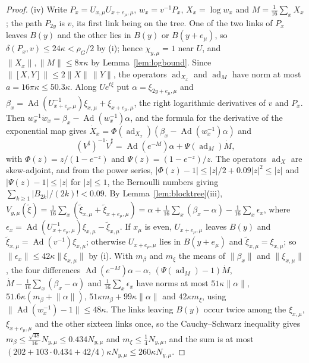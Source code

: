 \documentclass[11pt]{amsart}
\theoremstyle{definition}
\theoremstyle{remark}
\numberwithin{equation}{section}
\begin{document}
\begin{proof}
(iv) Write $P_x=U_{x,\mu}U_{x+e_\mu,\mu}$, $w_x=v^{-1}P_x$, $X_x=\log w_x$
and $M=\frac1{16}\sum_xX_x$; the path $P_{2y}$ is $v$, its first link being
on the tree. One of the two links of $P_x$ leaves $B(y)$ and the other lies
in $B(y)$ or $B(y+e_\mu)$, so $\delta(P_x,v)\le24\kappa<\rho_G/2$ by (i);
hence $\chi_{y,\mu}=1$ near $U$, and $\lVert X_x\rVert,\lVert M\rVert\le
8\pi\kappa$ by Lemma~\ref{lem:logbound}. Since $\lVert[X,Y]\rVert\le2
\lVert X\rVert\,\lVert Y\rVert$, the operators $\operatorname{ad}_{X_x}$
and $\operatorname{ad}_M$ have norm at most $a=16\pi\kappa\le50.3\kappa$.
Along $Ue^{t\xi}$ put $\alpha=\xi_{2y+e_\mu,\mu}$ and $\beta_x=
\operatorname{Ad}(U_{x+e_\mu,\mu}^{-1})\xi_{x,\mu}+\xi_{x+e_\mu,\mu}$, the
right logarithmic derivatives of $v$ and $P_x$. Then $w_x^{-1}\dot w_x=
\beta_x-\operatorname{Ad}(w_x^{-1})\alpha$, and the formula for the
derivative of the exponential map gives $\dot X_x=\Phi(\operatorname{ad}
_{X_x})(\beta_x-\operatorname{Ad}(w_x^{-1})\alpha)$ and
\[
(V^\sharp)^{-1}\dot V^\sharp=\operatorname{Ad}(e^{-M})\alpha+\Psi(
\operatorname{ad}_M)\dot M,
\]
with $\Phi(z)=z/(1-e^{-z})$ and $\Psi(z)=(1-e^{-z})/z$. The operators
$\operatorname{ad}_X$ are skew-adjoint, and from the power series,
$|\Phi(z)-1|\le|z|/2+0.09|z|^2\le|z|$ and $|\Psi(z)-1|\le|z|$ for $|z|\le
1$, the Bernoulli numbers giving $\sum_{k\ge1}|B_{2k}|/(2k)!<0.09$.
By Lemma~\ref{lem:blocktree}(iii), $V_{y,\mu}(\tilde\xi)=\frac1{16}\sum_x
(\tilde\xi_{x,\mu}+\tilde\xi_{x+e_\mu,\mu})=\alpha+\frac1{16}\sum_x(\beta_x
-\alpha)-\frac1{16}\sum_x\epsilon_x$, where $\epsilon_x=\operatorname{Ad}(
U_{x+e_\mu,\mu}^{-1})\xi_{x,\mu}-\tilde\xi_{x,\mu}$. If $x_\mu$ is even,
$U_{x+e_\mu,\mu}$ leaves $B(y)$ and $\tilde\xi_{x,\mu}=\operatorname{Ad}(v^{-
1})\xi_{x,\mu}$; otherwise $U_{x+e_\mu,\mu}$ lies in $B(y+e_\mu)$ and
$\tilde\xi_{x,\mu}=\xi_{x,\mu}$; so $\lVert\epsilon_x\rVert\le42\kappa\lVert
\xi_{x,\mu}\rVert$ by (i). With $m_\beta$ and $m_\xi$ the means of $\lVert
\beta_x\rVert$ and $\lVert\xi_{x,\mu}\rVert$, the four differences
$\operatorname{Ad}(e^{-M})\alpha-\alpha$, $(\Psi(\operatorname{ad}_M)-1)
\dot M$, $\dot M-\frac1{16}\sum_x(\beta_x-\alpha)$ and $\frac1{16}\sum_x
\epsilon_x$ have norms at most $51\kappa\lVert\alpha\rVert$, $51.6\kappa(
m_\beta+\lVert\alpha\rVert)$, $51\kappa m_\beta+99\kappa\lVert\alpha\rVert$
and $42\kappa m_\xi$, using $\lVert\operatorname{Ad}(w_x^{-1})-1\rVert\le
48\kappa$. The links leaving $B(y)$ occur twice among the $\xi_{x,\mu}$,
$\xi_{x+e_\mu,\mu}$ and the other sixteen links once, so the Cauchy--Schwarz
inequality gives $m_\beta\le\frac{\sqrt{48}}{16}N_{y,\mu}\le0.434N_{y,\mu}$
and $m_\xi\le\frac14N_{y,\mu}$, and the sum is at most $(202+103\cdot0.434
+42/4)\kappa N_{y,\mu}\le260\kappa N_{y,\mu}$.
\end{proof}
\end{document}
